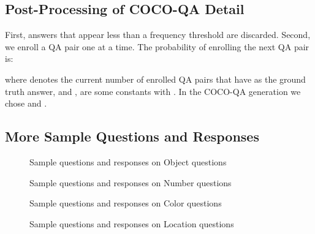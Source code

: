 \documentclass{article} \usepackage{nips15submit_e,times}
\renewcommand{\#}[1]{\textbf{#1}}
\begin{document}
\subsection{Post-Processing of COCO-QA Detail}
\label{app:post_process}
First, answers that appear less than a frequency threshold are discarded.
Second, we enroll a QA pair one at a time.  The probability of enrolling the
next QA pair  is:

where  denotes the current number of enrolled QA pairs that have 
as the ground truth answer, and ,  are some constants with .
In the COCO-QA generation we chose  and . 

\clearpage
\subsection{More Sample Questions and Responses}
\label{sec:more_examples}
\begin{figure}[h]
\centering
\tiny

\caption{Sample questions and responses on Object questions}
\label{fig:object_questions}
\end{figure}

\begin{figure}[ht]
\centering
\tiny


\caption{Sample questions and responses on Number questions}
\label{fig:number_questions}
\end{figure}

\begin{figure}[ht!]
\centering
\tiny


\caption{Sample questions and responses on Color questions}
\label{fig:color_questions}
\end{figure}

\begin{figure}[ht!]
\centering
\tiny

\caption{Sample questions and responses on Location questions}
\label{fig:location_questions}
\end{figure}
 
\end{document}
